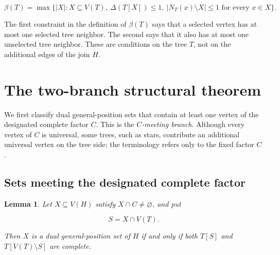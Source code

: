 \documentclass[11pt,a4paper]{article}
\newtheorem{lemma}[theorem]{Lemma}
\numberwithin{equation}{section}
\begin{document}
\[
\beta(T)=\max\bigl\{|X|:X\subseteq V(T),\ \Delta(T[X])\le 1,
\ |N_T(x)\setminus X|\le 1\text{ for every }x\in X\bigr\}.
\]

The first constraint in the definition of \(\beta(T)\) says that a
selected vertex has at most one selected tree neighbor. The second says
that it also has at most one unselected tree neighbor. These are
conditions on the tree \(T\), not on the additional edges of the join
\(H\).

\section{The two-branch structural theorem}\label{sec:structure}

We first classify dual general-position sets that contain at least one
vertex of the designated complete factor \(C\). This is the
\emph{\(C\)-meeting branch}. Although every vertex of \(C\) is universal,
some trees, such as stars, contribute an additional universal vertex on
the tree side; the terminology refers only to the fixed factor \(C\).

\subsection{Sets meeting the designated complete factor}\label{sec:apex-meeting}

\begin{lemma}\label{lem:apex-meeting}
Let \(X\subseteq V(H)\) satisfy
\(X\cap C\ne\varnothing\), and put

\[
S=X\cap V(T).
\]

Then \(X\) is a dual general-position set of \(H\) if and only if both
\(T[S]\) and \(T[V(T)\setminus S]\) are complete.
\end{lemma}
\end{document}
